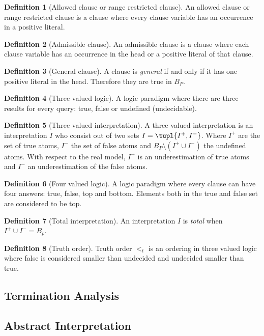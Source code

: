 \documentclass{article}
\newcommand{\brak}[1]{\ensuremath{\left(#1\right)}}
\theoremstyle{definition}
\newtheorem{definition}{Definition}
\theoremstyle{plain}
\begin{document}
\begin{definition}[Allowed clause or range restricted clause]
An allowed clause or range restricted clause is a clause where every clause variable has an occurrence in a positive literal.
\end{definition}
\begin{definition}[Admissible clause]
An admissible clause is a clause where each clause variable has an occurrence in the head or a positive literal of that clause.
\end{definition}
\begin{definition}[General clause]
A clause is \emph{general} if and only if it has one positive literal in the head. Therefore they are true in $B_P$.
\end{definition}
\begin{definition}[Three valued logic]
A logic paradigm where there are three results for every query: true, false or undefined (undecidable).
\end{definition}
\begin{definition}[Three valued interpretation]
A three valued interpretation is an interpretation $I$ who consist out of two sets $I=\tupl{I^+,I^-}$. Where $I^+$ are the set of true atoms, $I^-$ the set of false atoms and $B_P\setminus\brak{I^+\cup I^-}$ the undefined atoms. With respect to the real model, $I^+$ is an underestimation of true atoms and $I^-$ an underestimation of the false atoms.
\end{definition}
\begin{definition}[Four valued logic]
A logic paradigm where every clause can have four answers: true, false, top and bottom. Elements both in the true and false set are considered to be top.
\end{definition}
\begin{definition}[Total interpretation]
An interpretation $I$ is \emph{total} when $I^+\cup I^-=B_p$.
\end{definition}
\begin{definition}[Truth order]
Truth order $<_t$ is an ordering in three valued logic where false is considered smaller than undecided and undecided smaller than true.
\end{definition}

\subsection{Termination Analysis}
\subsection{Abstract Interpretation}
\end{document}
